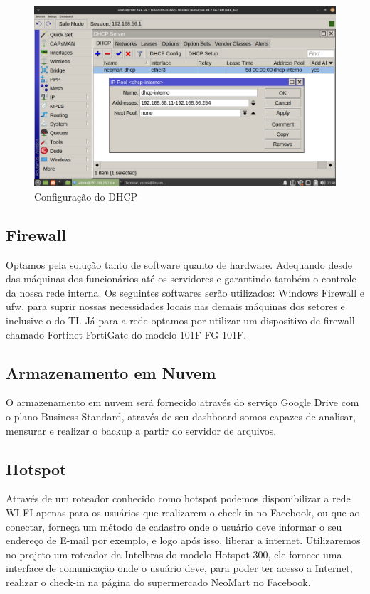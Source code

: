 \documentclass[12pt]{article}
\begin{document}
\begin{figure}[ht]
\centering
\includegraphics[height=0.5\textwidth]{roteador-dhcp-range.png}
\caption{Configuração do DHCP}
\label{fig:dhcp}
\end{figure}

\newpage

\subsection{Firewall}
Optamos pela solução tanto de software quanto de hardware. Adequando desde das máquinas dos funcionários até os servidores e garantindo também o controle da nossa rede interna. Os seguintes softwares serão utilizados: Windows Firewall e ufw, para suprir nossas necessidades locais nas demais máquinas dos setores e inclusive o do TI. Já para a rede optamos por utilizar um dispositivo de firewall chamado Fortinet FortiGate do modelo 101F FG-101F.

\subsection{Armazenamento em Nuvem}
O armazenamento em nuvem será fornecido através do serviço Google Drive com o plano Business Standard, através de seu dashboard somos capazes de analisar, mensurar e realizar o backup a partir do servidor de arquivos.

\subsection{Hotspot}
Através de um roteador conhecido como hotspot podemos disponibilizar a rede WI-FI apenas para os usuários que realizarem o check-in no Facebook, ou que ao conectar, forneça um método de cadastro onde o usuário deve informar o seu endereço de E-mail por exemplo, e logo após isso, liberar a internet.\newline
Utilizaremos no projeto um roteador da Intelbras do modelo Hotspot 300, ele fornece uma interface de comunicação onde o usuário deve, para poder ter acesso a Internet, realizar o check-in na página do supermercado NeoMart no Facebook.
\end{document}
